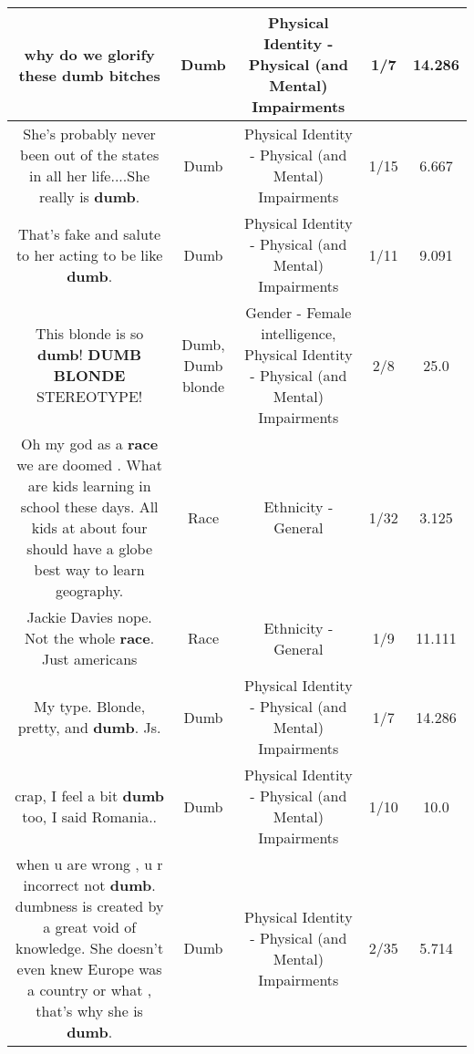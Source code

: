 \documentclass[11pt]{article}
\newlength\mylength
\begin{document}
\begin{center}
\begin{longtable}{|C{.65\mylength}|C{.30\mylength}|C{.12\mylength}|C{.12\mylength}|C{.12\mylength}|}
  \small why do we glorify these \textbf{dumb} bitches\normalsize   & Dumb & Physical Identity - Physical (and Mental) Impairments & 1/7 & 14.286 \\  \hline
  \small She's probably never been out of the states in all her life....She really is \textbf{dumb}.\normalsize   & Dumb & Physical Identity - Physical (and Mental) Impairments & 1/15 & 6.667 \\  \hline
  \small That's fake and salute to her acting to be like \textbf{dumb}.\normalsize   & Dumb & Physical Identity - Physical (and Mental) Impairments & 1/11 & 9.091 \\  \hline
  \small This blonde is so \textbf{dumb}! \textbf{D\textbf{UMB} BLONDE} STEREOTYPE!\normalsize   & Dumb, Dumb blonde & Gender - Female intelligence, Physical Identity - Physical (and Mental) Impairments & 2/8 & 25.0 \\  \hline
  \small Oh my god as a \textbf{race} we are doomed . What are kids learning in school these days. All kids at about four should have a globe best way to learn geography.\normalsize   & Race & Ethnicity - General & 1/32 & 3.125 \\  \hline
  \small Jackie Davies nope. Not the whole \textbf{race}. Just americans\normalsize   & Race & Ethnicity - General & 1/9 & 11.111 \\  \hline
  \small My type. Blonde, pretty, and \textbf{dumb}. Js.\normalsize   & Dumb & Physical Identity - Physical (and Mental) Impairments & 1/7 & 14.286 \\  \hline
  \small crap, I feel a bit \textbf{dumb} too, I said Romania..\normalsize   & Dumb & Physical Identity - Physical (and Mental) Impairments & 1/10 & 10.0 \\  \hline
  \small when u are wrong , u r incorrect not \textbf{dumb}. dumbness is created by a great void of knowledge. She doesn't even knew Europe was a country or what , that's why she is \textbf{dumb}.\normalsize   & Dumb & Physical Identity - Physical (and Mental) Impairments & 2/35 & 5.714 \\  \hline

\end{longtable}
\end{center}
\end{document}
